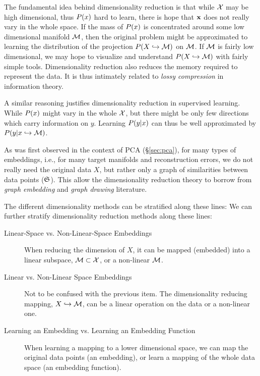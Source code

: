 The fundamental idea behind dimensionality reduction is that while $\mathcal{X}$ may be high dimensional, thus $P(x)$ hard to learn, there is hope that $\mathbf{x}$ does not really vary in the whole space. 
If the mass of $P(x)$ is concentrated around some low dimensional manifold $\mathcal{M}$, then the original problem might be approximated to learning the distribution of the projection $P(X \hookrightarrow \mathcal{M})$ on $\mathcal{M}$. 
If $\mathcal{M}$ is fairly low dimensional, we may hope to visualize and understand $P(X \hookrightarrow \mathcal{M})$ with fairly simple tools.
Dimensionality reduction also reduces the memory required to represent the data. It is thus intimately related to \emph{lossy compression} in information theory.

A similar reasoning justifies dimensionality reduction in supervised learning. 
While $P(x)$ might vary in the whole $\mathcal{X}$, but there might be only few directions which carry information on $y$. Learning $P(y|x)$ can thus be well approximated by $P(y|x \hookrightarrow \mathcal{M})$.

As was first observed in the context of PCA (\S\ref{sec:pca}), for many types of embeddings, i.e., for many target manifolds and reconstruction errors, we do not really need the original data $X$, but rather only a graph of similarities between data points ($\mathfrak{S}$). 
This allow the dimensionality reduction theory to borrow from \emph{graph embedding} and \emph{graph drawing} literature. 


The different dimensionality methods can be stratified along these lines:
We can further stratify dimensionality reduction methods along these lines:
	\begin{description}
	\item[Linear-Space vs. Non-Linear-Space Embeddings] 
	When reducing the dimension of $X$, it can be mapped (embedded) into a linear subspace, $\mathcal{M} \subset \mathcal{X}$, or a non-linear $\mathcal{M}$.
	
	\item[Linear vs. Non-Linear Space Embeddings]
	Not to be confused with the previous item. 
	The dimensionality reducing mapping, $X \hookrightarrow \mathcal{M}$, can be a linear operation on the data or a non-linear one.
	
	\item[Learning an Embedding vs. Learning an Embedding Function]
	When learning a mapping to a lower dimensional space, we can map the original data points (an embedding), or learn a mapping of the whole data space (an embedding function).
	\end{description}



